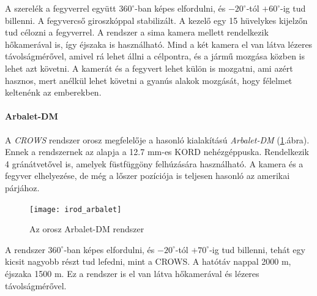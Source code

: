 \documentclass[12pt,a4paper]{article}
\begin{document}
A szerelék a fegyverrel együtt $360^\circ$-ban képes elfordulni, és $-20^{\circ}$-tól $+60^{\circ}$-ig tud billenni. A fegyvercső giroszkóppal stabilizált. A kezelő egy 15 hüvelykes kijelzőn tud célozni a fegyverrel. A rendszer a sima kamera mellett rendelkezik hőkamerával is, így éjszaka is használható. Mind a két kamera el van látva lézeres távolságmérővel, amivel rá lehet állni a célpontra, és a jármű mozgása közben is lehet azt követni. A kamerát és a fegyvert lehet külön is mozgatni, ami azért hasznos, mert anélkül lehet követni a gyanús alakok mozgását, hogy félelmet keltenénk az emberekben.

\paragraph{Arbalet-DM \cite{arbalet}}
A \textsl{CROWS} rendszer orosz megfelelője a hasonló kialakítású \textsl{Arbalet-DM} (\ref{fig:irod_arbalet}.ábra). Ennek a rendszernek az alapja a 12.7 mm-es KORD nehézgéppuska. Rendelkezik 4 gránátvetővel is, amelyek füstfüggöny felhúzására használható. A kamera és a fegyver elhelyezése, de még a lőszer pozíciója is teljesen hasonló az amerikai párjához.

\begin{figure}[h!]
	\centering
	\texttt{[image: irod\_arbalet]}
	\caption{Az orosz Arbalet-DM rendszer}
	\label{fig:irod_arbalet}
\end{figure}

A rendszer $360^\circ$-ban képes elfordulni, és $-20^{\circ}$-tól $+70^{\circ}$-ig tud billenni, tehát egy kicsit nagyobb részt tud lefedni, mint a CROWS. A hatótáv nappal 2000 m, éjszaka 1500 m. Ez a rendszer is el van látva hőkamerával és lézeres távolságmérővel.
\end{document}
